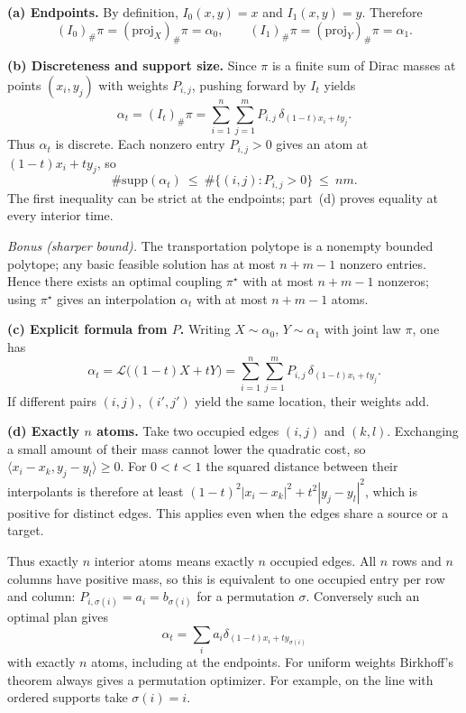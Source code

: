 \documentclass[11pt,a4paper]{article}
\theoremstyle{exostyle}
\newcommand{\push}{\#}
\begin{document}
\begin{solution}
\textbf{(a) Endpoints.}
By definition, $I_0(x,y)=x$ and $I_1(x,y)=y$. Therefore
\[
(I_0)_{\push}\pi=(\mathrm{proj}_X)_{\push}\pi=\alpha_0,\qquad
(I_1)_{\push}\pi=(\mathrm{proj}_Y)_{\push}\pi=\alpha_1.
\]

\medskip
\textbf{(b) Discreteness and support size.}
Since $\pi$ is a finite sum of Dirac masses at points $(x_i,y_j)$ with weights $P_{i,j}$, pushing forward by $I_t$ yields
\[
\alpha_t=(I_t)_{\push}\pi
=\sum_{i=1}^n\sum_{j=1}^m P_{i,j}\,\delta_{(1-t)x_i+ty_j}.
\]
Thus $\alpha_t$ is discrete. Each nonzero entry $P_{i,j}>0$ gives an atom at $(1-t)x_i+ty_j$, so
\[
\#\mathrm{supp}(\alpha_t)\ \le\ \#\{(i,j):P_{i,j}>0\}\ \le\ nm.
\]
The first inequality can be strict at the endpoints; part~(d) proves equality at every interior time.

\emph{Bonus (sharper bound).} The transportation polytope is a nonempty bounded polytope; any basic feasible solution has at most $n+m-1$ nonzero entries. Hence there exists an optimal coupling $\pi^\star$ with at most $n+m-1$ nonzeros; using $\pi^\star$ gives an interpolation $\alpha_t$ with at most $n+m-1$ atoms.

\medskip
\textbf{(c) Explicit formula from $P$.}
Writing $X\sim\alpha_0$, $Y\sim\alpha_1$ with joint law $\pi$, one has
\[
\alpha_t=\mathcal L\!\big((1-t)X+tY\big)
=\sum_{i=1}^n\sum_{j=1}^m P_{i,j}\,\delta_{(1-t)x_i+ty_j}.
\]
If different pairs $(i,j)$, $(i',j')$ yield the same location, their weights add.

\medskip

\textbf{(d) Exactly $n$ atoms.}
Take two occupied edges $(i,j)$ and $(k,l)$. Exchanging a small amount
of their mass cannot lower the quadratic cost, so
$\langle x_i-x_k,y_j-y_l\rangle\ge0$. For $0<t<1$ the squared distance
between their interpolants is therefore at least
$(1-t)^2|x_i-x_k|^2+t^2|y_j-y_l|^2$, which is positive for distinct
edges. This applies even when the edges share a source or a target.

Thus exactly $n$ interior atoms means exactly $n$ occupied edges.
All $n$ rows and $n$ columns have positive mass, so this is equivalent
to one occupied entry per row and column: $P_{i,\sigma(i)}=a_i=b_{\sigma(i)}$
for a permutation $\sigma$. Conversely such an optimal plan gives
\[
\alpha_t=\sum_i a_i\delta_{(1-t)x_i+ty_{\sigma(i)}}
\]
with exactly $n$ atoms, including at the endpoints. For uniform weights
Birkhoff's theorem always gives a permutation optimizer. For example,
on the line with ordered supports take $\sigma(i)=i$.
\end{solution}
\end{document}
